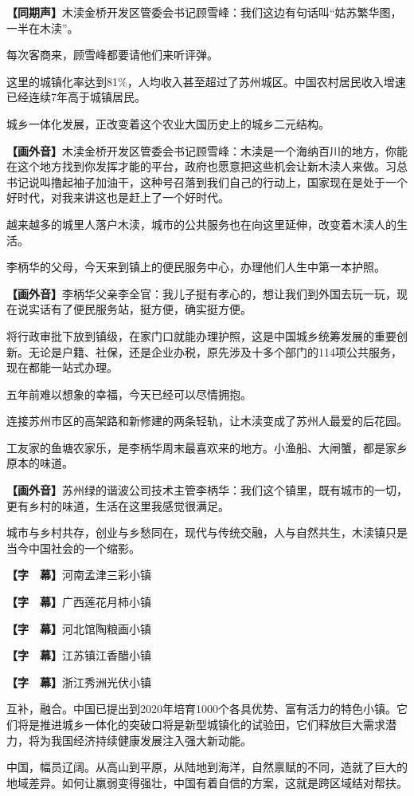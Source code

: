 \documentclass{ctexart}
\newcommand{\zkh}[1]{\textbf{\hspace{-2.7em} 【#1】}}
\begin{document}
\zkh{同期声}木渎金桥开发区管委会书记顾雪峰：我们这边有句话叫``姑苏繁华图，一半在木渎''。

每次客商来，顾雪峰都要请他们来听评弹。

这里的城镇化率达到81{\%}，人均收入甚至超过了苏州城区。中国农村居民收入增速已经连续7年高于城镇居民。

城乡一体化发展，正改变着这个农业大国历史上的城乡二元结构。

\zkh{画外音}木渎金桥开发区管委会书记顾雪峰：木渎是一个海纳百川的地方，你能在这个地方找到你发挥才能的平台，政府也愿意把这些机会让新木渎人来做。习总书记说叫撸起袖子加油干，这种号召落到我们自己的行动上，国家现在是处于一个好时代，对我来讲这也是赶上了一个好时代。

越来越多的城里人落户木渎，城市的公共服务也在向这里延伸，改变着木渎人的生活。

李柄华的父母，今天来到镇上的便民服务中心，办理他们人生中第一本护照。

\zkh{画外音}李柄华父亲李全官：我儿子挺有孝心的，想让我们到外国去玩一玩，现在说实话有了便民服务站，挺方便，确实挺方便。

将行政审批下放到镇级，在家门口就能办理护照，这是中国城乡统筹发展的重要创新。无论是户籍、社保，还是企业办税，原先涉及十多个部门的114项公共服务，现在都能一站式办理。

五年前难以想象的幸福，今天已经可以尽情拥抱。

连接苏州市区的高架路和新修建的两条轻轨，让木渎变成了苏州人最爱的后花园。

工友家的鱼塘农家乐，是李柄华周末最喜欢来的地方。小渔船、大闸蟹，都是家乡原本的味道。

\zkh{画外音}苏州绿的谐波公司技术主管李柄华：我们这个镇里，既有城市的一切，更有乡村的味道，生活在这里我感觉很满足。

城市与乡村共存，创业与乡愁同在，现代与传统交融，人与自然共生，木渎镇只是当今中国社会的一个缩影。

\zkh{字　幕}河南孟津三彩小镇

\zkh{字　幕}广西莲花月柿小镇

\zkh{字　幕}河北馆陶粮画小镇

\zkh{字　幕}江苏镇江香醋小镇

\zkh{字　幕}浙江秀洲光伏小镇

互补，融合。中国已提出到2020年培育1000个各具优势、富有活力的特色小镇。它们将是推进城乡一体化的突破口将是新型城镇化的试验田，它们释放巨大需求潜力，将为我国经济持续健康发展注入强大新动能。

中国，幅员辽阔。从高山到平原，从陆地到海洋，自然禀赋的不同，造就了巨大的地域差异。如何让羸弱变得强壮，中国有着自信的方案，这就是跨区域结对帮扶。
\end{document}
